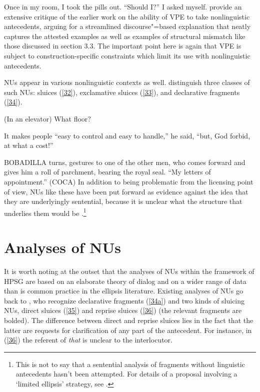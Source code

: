 \documentclass[output=paper
                ,modfonts
                ,nonflat
	        ,collection
	        ,collectionchapter
	        ,collectiontoclongg
 	        ,biblatex
                ,babelshorthands
                ,newtxmath
                ,draftmode
                ,colorlinks, citecolor=brown
]{./langsci/langscibook}
\begin{document}
{\ea Once in my room, I took the pills out. ``Should I?'' I asked myself. \citep[ex. 22a][]{Miller2014b}\label{31}\z
\citet{Miller2014b} provide an extensive critique of the earlier work on the ability of VPE to take nonlinguistic antecedents, arguing for a streamlined discourse"=based explanation that neatly captures the attested examples as well as examples of structural mismatch like those discussed in section 3.3. The important point here is again that VPE is subject to construction-specific constraints which limit its use with nonlinguistic antecedents.

NUs appear in various nonlinguistic contexts as well. \citet{Ginzburg2018} distinguish three classes of such NUs: sluices (\ref{32}), exclamative sluices (\ref{33}), and declarative fragments (\ref{34}).

\ea (In an elevator) What floor? \citep[298]{Ginzburg:Sag:2000}\label{32}\z

\ea It makes people ``easy to control and easy to handle,'' he said, ``but, God forbid, at what a cost!''
\label{33}\z

\ea BOBADILLA turns, gestures to one of the other men, who comes forward and gives him a roll of parchment, bearing the royal seal. ``My letters of appointment.'' (COCA)\label{34}\z
In addition to being problematic from the licensing point of view, NUs like these have been put forward as evidence against the idea that they are underlyingly sentential, because it is unclear what the structure that underlies them would be \citep[see][]{Ginzburg:Sag:2000, CJ2005a, Stainton2006}.\footnote{This is not to say that a sentential analysis of fragments without linguistic antecedents hasn't been attempted. For details of a proposal involving a `limited ellipsis' strategy, see \citet{Merchant2004}.}


\section{Analyses of NUs}
It is worth noting at the outset that the analyses of NUs within the framework of HPSG are based on an elaborate theory of dialog \citep{Ginzburg1994, Ginzburg2004, Ginzburg2014a, Larsson2002, Purver2006, Fernandez2006, Fernandez2002, Fernandez2007, Ginzburg2010, Ginzburg2014b, Ginzburg2012, Ginzburg2013} and on a wider range of data than is common practice in the ellipsis literature. Existing analyses of NUs go back to \citet{Ginzburg:Sag:2000}, who recognize declarative fragments (\ref{34a}) and two kinds of sluicing NUs, direct sluices (\ref{35}) and reprise sluices (\ref{36}) (the relevant fragments are bolded). The difference between direct and reprise sluices lies in the fact that the latter are requests for clarification of any part of the antecedent. For instance, in (\ref{36}) the referent of {\it that} is unclear to the interlocutor.

}
\end{document}
